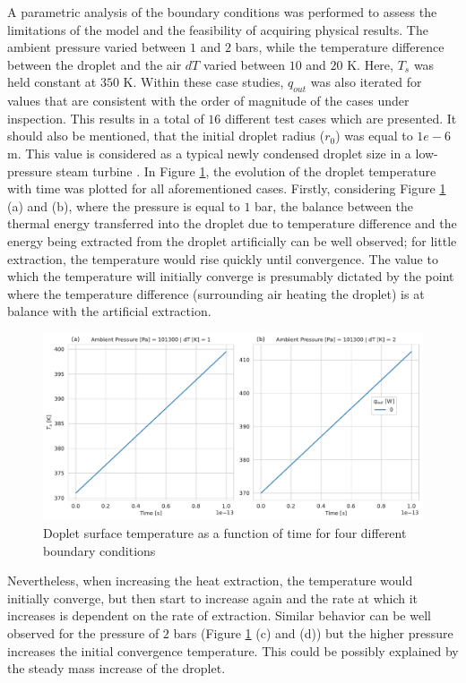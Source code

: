 \documentclass[12pt]{article}
\begin{document}
A parametric analysis of the boundary conditions was performed to assess the limitations of the model and the feasibility of acquiring physical results. The ambient pressure varied between $1$ and $2$ bars, while the temperature difference between the droplet and the air $dT$ varied between $10$ and $20$ K. Here, $T_{s}$ was held constant at $350$ K. Within these case studies, $q_{out}$ was also iterated for values that are consistent with the order of magnitude of the cases under inspection. This results in a total of $16$ different test cases which are presented. It should also be mentioned, that the initial droplet radius ($r_{0}$) was equal to $1e-6$ m. This value is considered as a typical newly condensed droplet size in a low-pressure steam turbine \cite{patel2016influence}.  In Figure \ref{f:T_s}, the evolution of the droplet temperature with time was plotted for all aforementioned cases. Firstly, considering Figure \ref{f:T_s} (a) and (b), where the pressure is equal to $1$ bar, the balance between the thermal energy transferred into the droplet due to temperature difference and the energy being extracted from the droplet artificially can be well observed; for little extraction, the temperature would rise quickly until convergence. The value to which the temperature will initially converge is presumably dictated by the point where the temperature difference (surrounding air heating the droplet) is at balance with the artificial extraction.

\begin{figure}[H]
    \centering
    \includegraphics[width=1\textwidth]{Figures/T_s.pdf}
    \caption{Doplet surface temperature as a function of time for four different boundary conditions}
    \label{f:T_s}
\end{figure}

Nevertheless, when increasing the heat extraction, the temperature would initially converge, but then start to increase again and the rate at which it increases is dependent on the rate of extraction. Similar behavior can be well observed for the pressure of $2$ bars (Figure \ref{f:T_s} (c) and (d)) but the higher pressure increases the initial convergence temperature. This could be possibly explained by the steady mass increase of the droplet.
\end{document}

